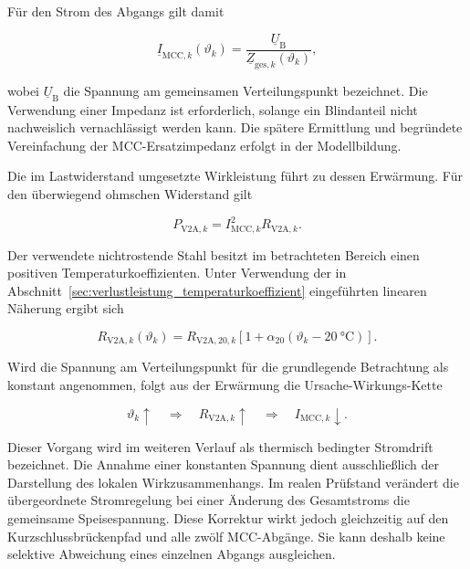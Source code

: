 Für den Strom des Abgangs gilt damit

\begin{equation}
    \underline{I}_{\mathrm{MCC},k}(\vartheta_k)
    =
    \frac{\underline{U}_\mathrm{B}}
    {\underline{Z}_{\mathrm{ges},k}(\vartheta_k)},
    \label{eq:ist_modulstrom_temperatur}
\end{equation}

wobei \(\underline{U}_\mathrm{B}\) die Spannung am gemeinsamen
Verteilungspunkt bezeichnet. Die Verwendung einer Impedanz ist erforderlich,
solange ein Blindanteil nicht nachweislich vernachlässigt werden kann. Die
spätere Ermittlung und begründete Vereinfachung der
MCC-Ersatzimpedanz erfolgt in der Modellbildung.

Die im Lastwiderstand umgesetzte Wirkleistung führt zu dessen Erwärmung. Für
den überwiegend ohmschen Widerstand gilt

\begin{equation}
    P_{\mathrm{V2A},k}
    =
    I_{\mathrm{MCC},k}^{2}R_{\mathrm{V2A},k}.
    \label{eq:ist_verlustleistung_v2a}
\end{equation}

Der verwendete nichtrostende Stahl besitzt im betrachteten Bereich einen
positiven Temperaturkoeffizienten. Unter Verwendung der in
Abschnitt~\ref{sec:verlustleistung_temperaturkoeffizient} eingeführten
linearen Näherung ergibt sich

\begin{equation}
    R_{\mathrm{V2A},k}(\vartheta_k)
    =
    R_{\mathrm{V2A},20,k}
    \left[
        1+
        \alpha_{20}
        \left(\vartheta_k-\SI{20}{\degreeCelsius}\right)
    \right].
    \label{eq:ist_v2a_temperaturabhaengigkeit}
\end{equation}

Wird die Spannung am Verteilungspunkt für die grundlegende Betrachtung als
konstant angenommen, folgt aus der Erwärmung die Ursache-Wirkungs-Kette

\begin{equation}
    \vartheta_k \uparrow
    \quad\Longrightarrow\quad
    R_{\mathrm{V2A},k} \uparrow
    \quad\Longrightarrow\quad
    I_{\mathrm{MCC},k} \downarrow.
    \label{eq:ist_kausalkette_stromdrift}
\end{equation}

Dieser Vorgang wird im weiteren Verlauf als thermisch bedingter Stromdrift
bezeichnet. Die Annahme einer konstanten Spannung dient ausschließlich der
Darstellung des lokalen Wirkzusammenhangs. Im realen Prüfstand verändert die
übergeordnete Stromregelung bei einer Änderung des Gesamtstroms die
gemeinsame Speisespannung. Diese Korrektur wirkt jedoch gleichzeitig auf den
Kurzschlussbrückenpfad und alle zwölf MCC-Abgänge. Sie kann deshalb keine
selektive Abweichung eines einzelnen Abgangs ausgleichen.

